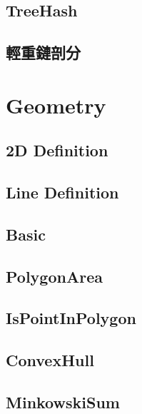\subsection{TreeHash}


\subsection{輕重鏈剖分}

\section{Geometry}

\subsection{2D Definition}


\subsection{Line Definition}


\subsection{Basic}


\subsection{PolygonArea}


\subsection{IsPointInPolygon}


\subsection{ConvexHull}


\subsection{MinkowskiSum}


